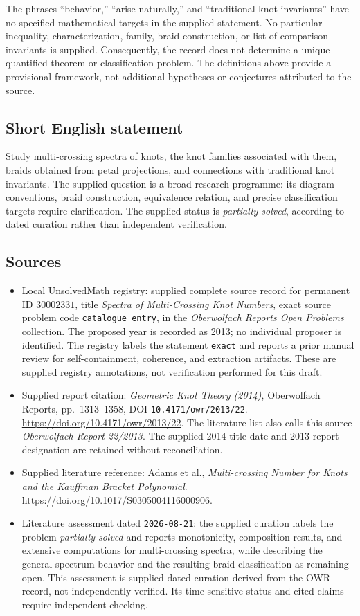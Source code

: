 \documentclass[11pt]{article}
\begin{document}
The phrases ``behavior,'' ``arise naturally,'' and ``traditional knot invariants'' have no specified mathematical targets in the supplied statement. No particular inequality, characterization, family, braid construction, or list of comparison invariants is supplied. Consequently, the record does not determine a unique quantified theorem or classification problem. The definitions above provide a provisional framework, not additional hypotheses or conjectures attributed to the source.
\subsection{Short English statement}
Study multi-crossing spectra of knots, the knot families associated with them, braids obtained from petal projections, and connections with traditional knot invariants. The supplied question is a broad research programme: its diagram conventions, braid construction, equivalence relation, and precise classification targets require clarification. The supplied status is \emph{partially solved}, according to dated curation rather than independent verification.
\subsection{Sources}
\begin{itemize}
\item Local UnsolvedMath registry: supplied complete source record for permanent ID \(30002331\), title \emph{Spectra of Multi-Crossing Knot Numbers}, exact source problem code \texttt{catalogue entry}, in the \emph{Oberwolfach Reports Open Problems} collection. The proposed year is recorded as 2013; no individual proposer is identified. The registry labels the statement \texttt{exact} and reports a prior manual review for self-containment, coherence, and extraction artifacts. These are supplied registry annotations, not verification performed for this draft.
\item Supplied report citation: \emph{Geometric Knot Theory (2014)}, Oberwolfach Reports, pp.\ 1313--1358, DOI \texttt{10.4171/owr/2013/22}. \url{https://doi.org/10.4171/owr/2013/22}. The literature list also calls this source \emph{Oberwolfach Report 22/2013}. The supplied 2014 title date and 2013 report designation are retained without reconciliation.
\item Supplied literature reference: Adams et al., \emph{Multi-crossing Number for Knots and the Kauffman Bracket Polynomial}. \url{https://doi.org/10.1017/S0305004116000906}.
\item Literature assessment dated \texttt{2026-08-21}: the supplied curation labels the problem \emph{partially solved} and reports monotonicity, composition results, and extensive computations for multi-crossing spectra, while describing the general spectrum behavior and the resulting braid classification as remaining open. This assessment is supplied dated curation derived from the OWR record, not independently verified. Its time-sensitive status and cited claims require independent checking.
\end{itemize}
\end{document}
